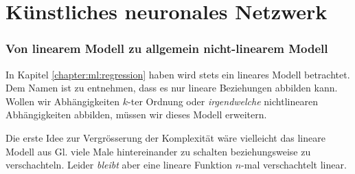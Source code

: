 \section{Künstliches neuronales Netzwerk\label{chapter:ml:ann}}

\subsubsection{Von linearem Modell zu allgemein nicht-linearem Modell}

In Kapitel \ref{chapter:ml:regression} haben wird stets ein lineares Modell betrachtet.
Dem Namen ist zu entnehmen, dass es nur lineare Beziehungen abbilden kann. 
Wollen wir Abhängigkeiten $k$-ter Ordnung oder \emph{irgendwelche} nichtlinearen
Abhängigkeiten abbilden, müssen wir dieses Modell erweitern.

Die erste Idee zur Vergrösserung der Komplexität wäre vielleicht das lineare Modell aus
Gl.  viele Male hintereinander zu schalten beziehungsweise zu
verschachteln. Leider \emph{bleibt} aber eine lineare Funktion $n$-mal verschachtelt
linear.

